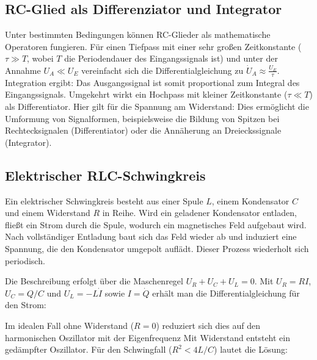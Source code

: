 
\subsection{RC-Glied als Differenziator und Integrator}
Unter bestimmten Bedingungen können RC-Glieder als mathematische Operatoren fungieren. Für einen Tiefpass mit einer sehr großen Zeitkonstante ($\tau \gg T$, wobei $T$ die Periodendauer des Eingangssignals ist) und unter der Annahme $U_A \ll U_E$ vereinfacht sich die Differentialgleichung zu $\dot{U}_A \approx \frac{U_E}{\tau}$. Integration ergibt:
Das Ausgangssignal ist somit proportional zum Integral des Eingangssignals. Umgekehrt wirkt ein Hochpass mit kleiner Zeitkonstante ($\tau \ll T$) als Differentiator. Hier gilt für die Spannung am Widerstand:
Dies ermöglicht die Umformung von Signalformen, beispielsweise die Bildung von Spitzen bei Rechtecksignalen (Differentiator) oder die Annäherung an Dreieckssignale (Integrator).

\subsection{Elektrischer RLC-Schwingkreis}
Ein elektrischer Schwingkreis besteht aus einer Spule $L$, einem Kondensator $C$ und einem Widerstand $R$ in Reihe. Wird ein geladener Kondensator entladen, fließt ein Strom durch die Spule, wodurch ein magnetisches Feld aufgebaut wird. Nach vollständiger Entladung baut sich das Feld wieder ab und induziert eine Spannung, die den Kondensator umgepolt auflädt. Dieser Prozess wiederholt sich periodisch.


Die Beschreibung erfolgt über die Maschenregel $U_R + U_C + U_L = 0$. Mit $U_R = RI$, $U_C = Q/C$ und $U_L = -L\dot{I}$ sowie $I = \dot{Q}$ erhält man die Differentialgleichung für den Strom:

Im idealen Fall ohne Widerstand ($R=0$) reduziert sich dies auf den harmonischen Oszillator mit der Eigenfrequenz
 Mit Widerstand entsteht ein gedämpfter Oszillator. Für den Schwingfall ($R^2 < 4L/C$) lautet die Lösung:


